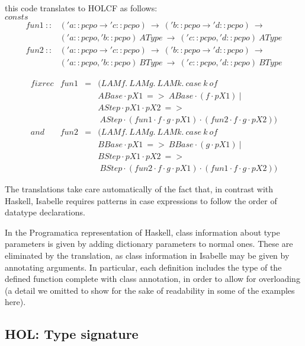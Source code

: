 \documentclass[a4paper,12pt]{article}
\begin{document}
\noindent this code translates to HOLCF as follows:\\

\noindent $consts $ 
$$ \begin{array}{ll} fun1 \ :: & ('a::pcpo \to 'c::pcpo) \ \to \ ('b::pcpo \to 'd::pcpo) \ \to \\
  & ('a::pcpo, 'b::pcpo) \ AType \ \to \ ('c::pcpo, 'd::pcpo) \ AType \\
  fun2 \ :: & ('a::pcpo \to 'c::pcpo) \ \to \ ('b::pcpo \to 
  'd::pcpo) \ \to \\ 
  & ('a::pcpo, 'b::pcpo) \ BType \ \to \ ('c::pcpo,
  'd::pcpo) \ BType 
\end{array}$$

$$\begin{array}{rccl} 
  fixrec & fun1 & = & (LAM f. \ LAM g. \ LAM k. \ case \ k \ of \\
  & & & ABase \cdot pX1 \ => \ ABase \cdot (f \cdot pX1) \ | \\
  & & & AStep \cdot pX1 \cdot pX2 \ => \\
  & & & \ AStep \cdot (fun1 \cdot f \cdot g \cdot pX1) \cdot (fun2 \cdot f \cdot g \cdot pX2)) \\
  and & fun2 & = & (LAM f. \ LAM g. \ LAM k. \ case \ k \ of \\
  & & & BBase \cdot pX1 \ => \ BBase \cdot (g \cdot pX1) \ | \\
  & & & BStep \cdot pX1 \cdot pX2 \ => \\
  & & & \ BStep \cdot (fun2 \cdot f \cdot g \cdot pX1) \cdot (fun1 \cdot f \cdot g \cdot pX2)) \end{array}$$

\noindent The translations take care automatically of the fact that,
in contrast with Haskell, Isabelle requires patterns in case
expressions to follow the order of datatype declarations.

In the Programatica representation of Haskell, class information about
type parameters is given by adding dictionary parameters to normal
ones. These are eliminated by the translation, as class information in
Isabelle may be given by annotating arguments. In particular, each
definition includes the type of the defined function complete with
class annotation, in order to allow for overloading (a detail we
omitted to show for the sake of readability in some of the examples
here).

\subsection{HOL: Type signature}
\end{document}
